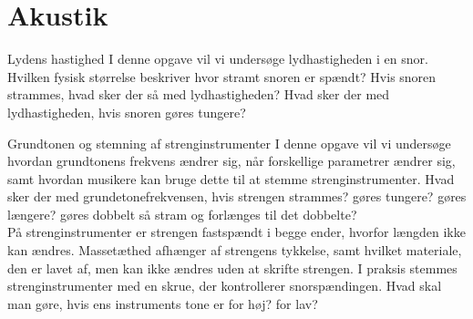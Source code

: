 \documentclass[crop=false, class=memoir]{standalone}
\begin{document}
\section{Akustik}
\begin{opgave}[1]{Lydens hastighed} \label{aku:opg:vlyd}
I denne opgave vil vi undersøge lydhastigheden i en snor.
\opg Hvilken fysisk størrelse beskriver hvor stramt snoren er spændt?
\opg Hvis snoren strammes, hvad sker der så med lydhastigheden?
\opg Hvad sker der med lydhastigheden, hvis snoren gøres tungere?
\end{opgave}
\begin{opgave}[1]{Grundtonen og stemning af strenginstrumenter}
I denne opgave vil vi undersøge hvordan grundtonens frekvens ændrer sig, når forskellige parametrer ændrer sig, samt hvordan musikere kan bruge dette til at stemme strenginstrumenter. Hvad sker der med grundetonefrekvensen, hvis strengen
\opg strammes?
\opg gøres tungere?
\opg gøres længere?
\opg gøres dobbelt så stram og forlænges til det dobbelte? \\[2mm]
På strenginstrumenter er strengen fastspændt i begge ender, hvorfor længden ikke kan ændres. Massetæthed afhænger af strengens tykkelse, samt hvilket materiale, den er lavet af, men kan ikke ændres uden at skrifte strengen. I praksis stemmes strenginstrumenter med en skrue, der kontrollerer snorspændingen. Hvad skal man gøre, hvis ens instruments tone er
\opg for høj?
\opg for lav?
\end{opgave}
\end{document}
